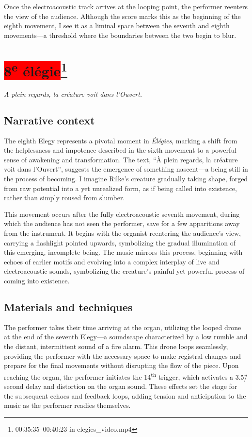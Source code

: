 \documentclass[12pt,twoside,maitrise]{dms_ks}
\theoremstyle{definition}
\begin{document}
{{Once the electroacoustic track arrives at the looping point, the performer reenters the view of the audience. 
Although the score marks this as the beginning of the eighth movement, I see it as a liminal space between the seventh and eighth movements---a threshold where the boundaries between the two begin to blur.

\section{\colorbox{red}{8\textsuperscript{e} élégie}\footnote{00:35:35--00:40:23 in elegies\_video.mp4}}

\epigraph{\textit{A plein regards, la créature voit dans l’Ouvert.}}{}

\subsection{Narrative context}

The eighth Elegy represents a pivotal moment in \textit{Élégies}, marking a shift from the helplessness and impotence described in the sixth movement to a powerful sense of awakening and transformation. 
The text, “À plein regards, la créature voit dans l’Ouvert”, suggests the emergence of something nascent—a being still in the process of becoming. 
I imagine Rilke's creature gradually taking shape, forged from raw potential into a yet unrealized form, as if being called into existence, rather than simply roused from slumber.

This movement occurs after the fully electroacoustic seventh movement, during which the audience has not seen the performer, save for a few apparitions away from the instrument. 
It begins with the organist reentering the audience's view, carrying a flashlight pointed upwards, symbolizing the gradual illumination of this emerging, incomplete being. 
The music mirrors this process, beginning with echoes of earlier motifs and evolving into a complex interplay of live and electroacoustic sounds, symbolizing the creature’s painful yet powerful process of coming into existence.

\subsection{Materials and techniques}

The performer takes their time arriving at the organ, utilizing the looped drone at the end of the seventh Elegy---a soundscape characterized by a low rumble and the distant, intermittent sound of a fire alarm. 
This drone loops seamlessly, providing the performer with the necessary space to make registral changes and prepare for the final movements without disrupting the flow of the piece. 
Upon reaching the organ, the performer initiates the 14\textsuperscript{th} trigger, which activates a 3.5\=/second delay and distortion on the organ sound. 
These effects set the stage for the subsequent echoes and feedback loops, adding tension and anticipation to the music as the performer readies themselves.

}}
\end{document}
